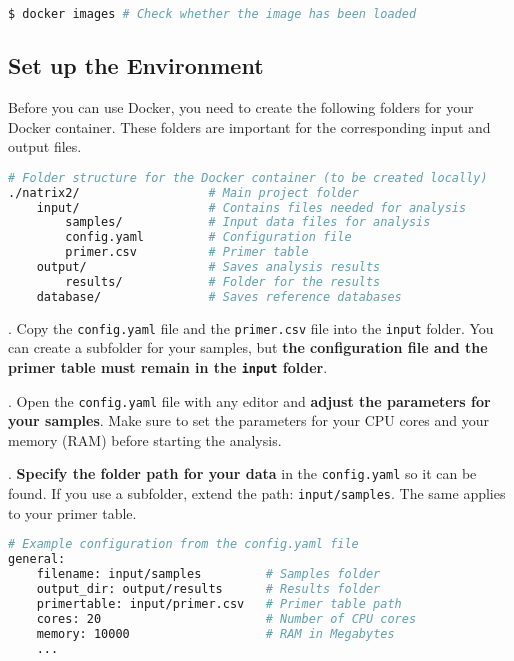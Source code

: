 \documentclass[a4paper,11pt]{article}
\newcommand{\vsp}{\vspace{0.2cm}}
\begin{document}
\begin{lstlisting}[language=bash]
$ docker images # Check whether the image has been loaded
\end{lstlisting}

\subsection{Set up the Environment}
Before you can use Docker, you need to create the following folders for your Docker container. These folders are important for the corresponding input and output files.

\begin{lstlisting}[language=bash]
# Folder structure for the Docker container (to be created locally)
./natrix2/                  # Main project folder
    input/                  # Contains files needed for analysis
        samples/            # Input data files for analysis
        config.yaml         # Configuration file
        primer.csv          # Primer table
    output/                 # Saves analysis results
        results/            # Folder for the results
    database/               # Saves reference databases
\end{lstlisting}
\vsp

. Copy the \texttt{config.yaml} file and the \texttt{primer.csv} file into the \texttt{input} folder. You can create a subfolder for your samples, but \textbf{the configuration file and the primer table must remain in the \texttt{input} folder}.

\vsp
{}. Open the \texttt{config.yaml} file with any editor and \textbf{adjust the parameters for your samples}. Make sure to set the parameters for your CPU cores and your memory (RAM) before starting the analysis.

\vsp
{}. \textbf{Specify the folder path for your data} in the \texttt{config.yaml} so it can be found. If you use a subfolder, extend the path: \texttt{input/samples}. The same applies to your primer table.

\begin{lstlisting}[language=bash]
# Example configuration from the config.yaml file
general:
    filename: input/samples         # Samples folder
    output_dir: output/results      # Results folder
    primertable: input/primer.csv   # Primer table path
    cores: 20                       # Number of CPU cores
    memory: 10000                   # RAM in Megabytes
    ...
\end{lstlisting}
\end{document}
